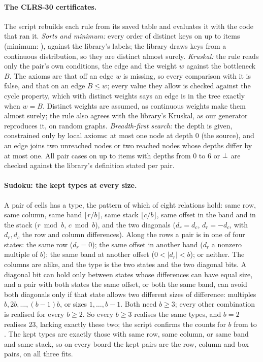 \paragraph{The CLRS-30 certificates.} The script rebuilds each rule from its saved table and evaluates it with the code
that ran it. \emph{Sorts and minimum:} every order of distinct keys on up to  items (minimum:
), against the library's labels; the library draws keys from a continuous distribution, so they are
distinct almost surely. \emph{Kruskal:} the rule reads only the pair's own conditions, the edge and the weight $w$ against
the bottleneck $B$. The axioms are that off an edge $w$ is missing, so every comparison with it is false, and that on an
edge $B \leq w$; every value they allow is checked against the cycle property, which with distinct weights says an edge
is in the tree exactly when $w = B$. Distinct weights are assumed, as continuous weights make them almost surely; the
rule also agrees with the library's Kruskal, as our generator reproduces it, on  random graphs.
\emph{Breadth-first search:} the depth is given, constrained only by local axioms: at most one node at depth $0$ (the
source), and an edge joins two unreached nodes or two reached nodes whose depths differ by at most one. All
 pair cases on up to  items with depths from 0 to 6 or $\bot$ are checked against
the library's definition stated per pair.

\paragraph{Sudoku: the kept types at every size.} A pair of cells has a type, the pattern of which of eight relations
hold: same row, same column, same band $\lfloor r/b\rfloor$, same stack $\lfloor c/b\rfloor$, same offset in the band and
in the stack ($r \bmod b$, $c \bmod b$), and the two diagonals ($d_r = d_c$, $d_r = -d_c$, with $d_r, d_c$ the row and
column differences). Along the rows a pair is in one of four states: the same row ($d_r=0$); the same offset in another
band ($d_r$ a nonzero multiple of $b$); the same band at another offset ($0<|d_r|<b$); or neither. The columns are
alike, and the type is the two states and the two diagonal bits. A diagonal bit can hold only between states whose
differences can have equal size, and a pair with both states the same offset, or both the same band, can avoid both
diagonals only if that state allows two different sizes of difference: multiples $b, 2b, \ldots, (b-1)b$, or sizes
$1,\ldots,b-1$. Both need $b \geq 3$; every other combination is realised for every $b \geq 2$. So every $b \geq 3$
realises the same  types, and $b=2$ realises 23, lacking exactly these two; the script confirms the
counts for $b$ from  to . The kept types are exactly those with same row, same column, or
same band and same stack, so on every board the kept pairs are the row, column and box pairs, on all three fits.

